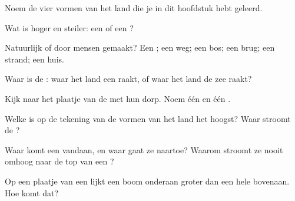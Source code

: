 \begin{exercise}[$\star$]\label{exo:g1:landscapes-around-us:1}
Noem de vier vormen van het land die je in dit hoofdstuk hebt geleerd.
\end{exercise}

\begin{exercise}[$\star$]\label{exo:g1:landscapes-around-us:2}
Wat is hoger en steiler: een  of een ?
\end{exercise}

\begin{exercise}[$\star$]\label{exo:g1:landscapes-around-us:3}
Natuurlijk of door mensen gemaakt? Een ; een weg; een bos; een brug; een strand; een huis.
\end{exercise}

\begin{exercise}[$\star$]\label{exo:g1:landscapes-around-us:4}
Waar is de : waar het land een  raakt, of waar het land de zee
raakt?
\end{exercise}

\begin{exercise}[$\star$]\label{exo:g1:landscapes-around-us:5}
Kijk naar het plaatje van de  met hun dorp. Noem één  en één .
\end{exercise}

\begin{exercise}[$\star$]\label{exo:g1:landscapes-around-us:6}
Welke  is op de tekening van de vormen van het land het hoogst?
Waar stroomt de ?
\end{exercise}

\begin{exercise}[$\star\star$]\label{exo:g1:landscapes-around-us:7}
Waar komt een  vandaan, en waar gaat ze naartoe? Waarom stroomt ze
nooit omhoog naar de top van een ?
\end{exercise}

\begin{exercise}[$\star\star$]\label{exo:g1:landscapes-around-us:8}
Op een plaatje van een  lijkt een boom onderaan groter dan een
hele  bovenaan. Hoe komt dat?
\end{exercise}

